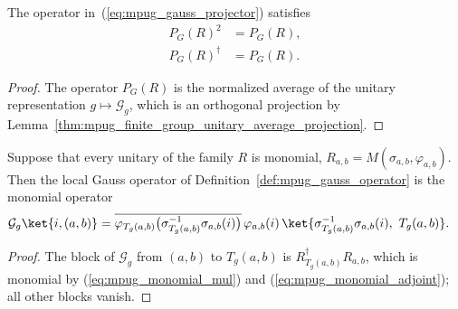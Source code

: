 \begin{lemma}
    \label{thm:mpug_gauss_projector_projection}
    \leanok
    The operator in~(\ref{eq:mpug_gauss_projector}) satisfies
    \begin{align}
        P_G(R)^2       & =P_G(R), \\
        P_G(R)^\dagger & =P_G(R).
    \end{align}
\end{lemma}

\begin{proof}\leanok
    The operator $P_G(R)$ is the normalized average of the unitary
    representation $g\mapsto\mathcal G_g$, which is an orthogonal projection
    by Lemma~\ref{thm:mpug_finite_group_unitary_average_projection}.
\end{proof}

\begin{lemma}
    \label{thm:mpug_gauss_operator_monomial}
    \leanok
    Suppose that every unitary of the family $R$ is monomial,
    $R_{a,b}=M(\sigma_{a,b},\varphi_{a,b})$. Then the local Gauss operator
    of Definition~\ref{def:mpug_gauss_operator} is the monomial operator
    \begin{align}
        \mathcal G_g\ket{i,(a,b)}
         & =\overline{\varphi_{T_g(a,b)}\bigl(\sigma_{T_g(a,b)}^{-1}\sigma_{a,b}(i)\bigr)}\,
        \varphi_{a,b}(i)\,
        \ket{\sigma_{T_g(a,b)}^{-1}\sigma_{a,b}(i),\ T_g(a,b)}.
        \label{eq:mpug_gauss_operator_monomial}
    \end{align}
\end{lemma}

\begin{proof}\leanok
    The block of $\mathcal G_g$ from $(a,b)$ to $T_g(a,b)$ is
    $R_{T_g(a,b)}^\dagger R_{a,b}$, which is monomial by
    (\ref{eq:mpug_monomial_mul}) and (\ref{eq:mpug_monomial_adjoint}); all
    other blocks vanish.
\end{proof}

